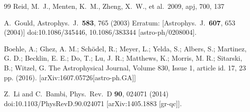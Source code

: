 \documentclass[prd, amsfonts, twocolumn, nofootinbib, showpacs]{revtex4}
\begin{document}
\begin{thebibliography}{99}
 Reid, M.~J., Menten, K.~M., Zheng, X.~W., et al.\ 2009, apj, 700, 137





  A.~Gould,
  Astrophys.\ J.\  {\bf 583}, 765 (2003)
  Erratum: [Astrophys.\ J.\  {\bf 607}, 653 (2004)]
  doi:10.1086/345446, 10.1086/383344
  [astro-ph/0208004].






 Boehle, A.; Ghez, A. M.; Schödel, R.; Meyer, L.; Yelda, S.; Albers, S.; Martinez, G. D.; Becklin, E. E.; Do, T.; Lu, J. R.; Matthews, K.; Morris, M. R.; Sitarski, B.; Witzel, G.
  The Astrophysical Journal, Volume 830, Issue 1, article id. 17, 23 pp. (2016).
  [arXiv:1607.05726[astro-ph.GA]]


  Z.~Li and C.~Bambi,
  Phys.\ Rev.\ D {\bf 90}, 024071 (2014)
  doi:10.1103/PhysRevD.90.024071
  [arXiv:1405.1883 [gr-qc]].




\end{thebibliography}
\end{document}
